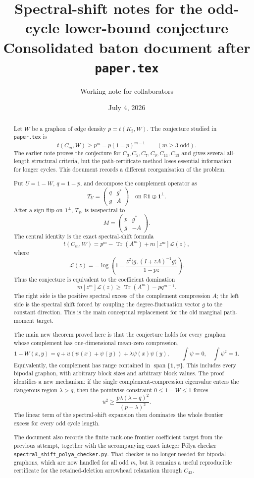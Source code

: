 \documentclass[11pt]{article}
\title{Spectral-shift notes for the odd-cycle lower-bound conjecture\\
\large Consolidated baton document after \texttt{paper.tex}}
\author{Working note for collaborators}
\date{July 4, 2026}
\newcommand{\one}{\mathbf 1}
\newcommand{\ip}[2]{\langle #1,#2\rangle}
\newcommand{\Tr}{\operatorname{Tr}}
\newcommand{\R}{\mathbb R}
\begin{document}
\maketitle

\begin{abstract}
Let $W$ be a graphon of edge density $p=t(K_2,W)$.  The conjecture studied in \texttt{paper.tex} is
\[
        t(C_m,W)\ge p^m-p(1-p)^{m-1}\qquad(m\ge3\text{ odd}).
\]
The earlier note proves the conjecture for $C_3,C_5,C_7,C_9,C_{11},C_{13}$ and gives several all-length structural criteria, but the path-certificate method loses essential information for longer cycles.  This document records a different reorganisation of the problem.

Put $U=1-W$, $q=1-p$, and decompose the complement operator as
\[
        T_U=\begin{pmatrix}q&g^*\\ g&A\end{pmatrix}
        \quad\text{on }\R\one\oplus\one^\perp .
\]
After a sign flip on $\one^\perp$, $T_W$ is isospectral to
\[
        M=\begin{pmatrix}p&g^*\\ g&-A\end{pmatrix}.
\]
The central identity is the exact spectral-shift formula
\[
        t(C_m,W)=p^m-\Tr(A^m)+m[z^m]\mathcal L(z),
\]
where
\[
        \mathcal L(z)=
        -\log\left(1-
        \frac{z^2\ip{g}{(I+zA)^{-1}g}}{1-pz}
        \right).
\]
Thus the conjecture is equivalent to the coefficient domination
\[
        m[z^m]\mathcal L(z)\ge \Tr(A^m)-pq^{m-1}.
\]
The right side is the positive spectral excess of the complement compression $A$; the left side is the spectral shift forced by coupling the degree-fluctuation vector $g$ to the constant direction.  This is the main conceptual replacement for the old marginal path-moment target.

The main new theorem proved here is that the conjecture holds for every graphon whose complement has one-dimensional mean-zero compression,
\[
        1-W(x,y)=q+u(\psi(x)+\psi(y))+\lambda\psi(x)\psi(y),
        \qquad \int\psi=0,
        \quad \int\psi^2=1.
\]
Equivalently, the complement has range contained in $\operatorname{span}\{\one,\psi\}$.  This includes every bipodal graphon, with arbitrary block sizes and arbitrary block values.  The proof identifies a new mechanism: if the single complement-compression eigenvalue enters the dangerous region $\lambda>q$, then the pointwise constraint $0\le1-W\le1$ forces
\[
        u^2\ge \frac{p\lambda(\lambda-q)^2}{(p-\lambda)^2}.
\]
The linear term of the spectral-shift expansion then dominates the whole frontier excess for every odd cycle length.

The document also records the finite rank-one frontier coefficient target from the previous attempt, together with the accompanying exact integer P\'olya checker \texttt{spectral\_shift\_polya\_checker.py}.  That checker is no longer needed for bipodal graphons, which are now handled for all odd $m$, but it remains a useful reproducible certificate for the retained-deletion arrowhead relaxation through $C_{43}$.
\end{abstract}
\end{document}
